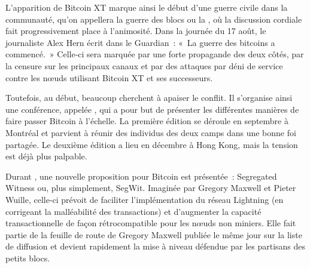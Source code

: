 L'apparition de Bitcoin XT marque ainsi le début d'une guerre civile dans la communauté, qu'on appellera la guerre des blocs ou la , où la discussion cordiale fait progressivement place à l'animosité. Dans la journée du 17 août, le journaliste Alex Hern écrit dans le Guardian~: «~La guerre des bitcoins a commencé.~» Celle-ci sera marquée par une forte propagande des deux côtés, par la censure sur les principaux canaux et par des attaques par déni de service contre les nœuds utilisant Bitcoin XT et ses successeurs.

Toutefois, au début, beaucoup cherchent à apaiser le conflit. Il s'organise ainsi une conférence, appelée , qui a pour but de présenter les différentes manières de faire passer Bitcoin à l'échelle. La première édition se déroule en septembre à Montréal et parvient à réunir des individus des deux camps dans une bonne foi partagée. Le deuxième édition a lieu en décembre à Hong Kong, mais la tension est déjà plus palpable.

Durant , une nouvelle proposition pour Bitcoin est présentée~: Segregated Witness ou, plus simplement, SegWit. Imaginée par Gregory Maxwell et Pieter Wuille, celle-ci prévoit de faciliter l'implémentation du réseau Lightning (en corrigeant la malléabilité des transactions) et d'augmenter la capacité transactionnelle de façon rétrocompatible pour les nœuds non miniers. Elle fait partie de la feuille de route de Gregory Maxwell publiée le même jour sur la liste de diffusion et devient rapidement la mise à niveau défendue par les partisans des petits blocs.

